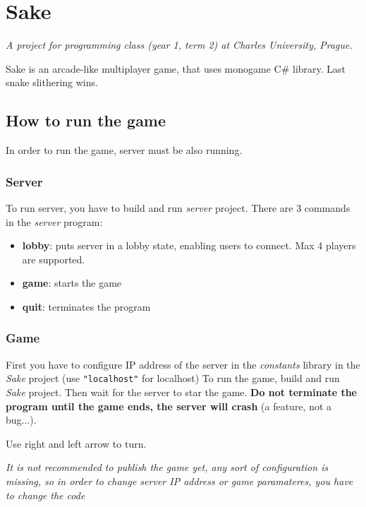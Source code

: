 \section*{Sake}\label{sake}

\textit{A project for programming class (year 1, term 2) at Charles University,
Prague.}
\medskip

Sake is an arcade-like multiplayer game, that uses monogame C\# library. Last snake slithering wins.

\subsection*{How to run the game}\label{how-to-run-the-game}

In order to run the game, server must be also running.

\subsubsection*{Server}\label{server}

To run server, you have to build and run \emph{server} project. There
are 3 commands in the \emph{server} program:

\begin{itemize}
\itemsep1pt\parskip0pt
\item
  \textbf{lobby}: puts server in a lobby state, enabling users to
  connect. Max 4 players are supported.
\item
  \textbf{game}: starts the game
\item
  \textbf{quit}: terminates the program
\end{itemize}

\subsubsection*{Game}\label{game}

First you have to configure IP address of the server in the
\emph{constants} library in the \emph{Sake} project (use
\texttt{"localhost"} for localhost) To run the game, build and run
\emph{Sake} project. Then wait for the server to star the game.
\textbf{Do not terminate the program until the game ends, the server
will crash} (a feature, not a bug...).

Use right and left arrow to turn.

\medskip
\emph{It is not recommended to publish the game yet, any sort of
configuration is missing, so in order to change server IP address or
game paramateres, you have to change the code}

